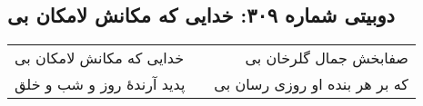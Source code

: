 \begin{center}
\section*{دوبیتی شماره ۳۰۹: خدایی که مکانش لامکان بی}
\label{sec:309}
\begin{longtable}{l p{0.5cm} r}
خدایی که مکانش لامکان بی
&&
صفابخش جمال گلرخان بی
\\
پدید آرندهٔ روز و شب و خلق
&&
که بر هر بنده او روزی رسان بی
\\
\end{longtable}
\end{center}
